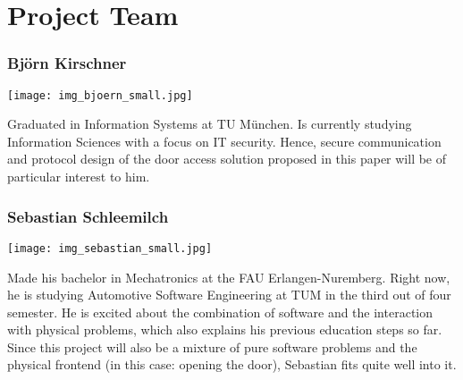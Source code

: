 \section{Project Team}\label{sec:team}

\subsubsection*{Björn Kirschner}
%
\begin{minipage}{0.2\textwidth}
\begin{flushleft}
	\texttt{[image: img\_bjoern\_small.jpg]}
\end{flushleft}
\end{minipage}
\hfill
\begin{minipage}{0.8\textwidth}
%
Graduated in Information Systems at TU München. Is currently studying Information Sciences with a focus on IT security. Hence, secure communication and protocol design of the door access solution proposed in this paper will be of particular interest to him.
%
\end{minipage}


\subsubsection*{Sebastian Schleemilch}
%
\begin{minipage}{0.2\textwidth}
\begin{flushleft}
	\texttt{[image: img\_sebastian\_small.jpg]}
\end{flushleft}
\end{minipage}
\hfill
\begin{minipage}{0.8\textwidth}
%
Made his bachelor in Mechatronics at the FAU Erlangen-Nuremberg. Right now, he is studying Automotive Software Engineering at TUM in the third out of four semester. He is excited about the combination of software and the interaction with physical problems, which also explains his previous education steps so far.
Since this project will also be a mixture of pure software problems and the physical frontend (in this case: opening the door), Sebastian fits quite well into it.

\end{minipage}


